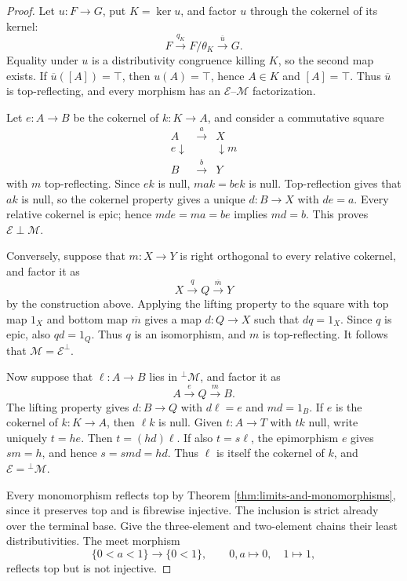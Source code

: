 \documentclass[12pt,oneside,reqno]{amsart}
\theoremstyle{definition}
\theoremstyle{remark}
\begin{document}
\begin{proof}
Let \(u:F\to G\), put \(K=\ker u\), and factor \(u\) through the
cokernel of its kernel:
\[
 F\xrightarrow{q_K}F/\theta_K
       \xrightarrow{\overline u}G.
\]
Equality under \(u\) is a distributivity congruence killing \(K\), so
the second map exists.  If
\(\overline u([A])=\top\), then \(u(A)=\top\), hence \(A\in K\) and
\([A]=\top\).  Thus \(\overline u\) is top-reflecting, and every
morphism has an \(\mathcal E\)--\(\mathcal M\) factorization.

Let \(e:A\to B\) be the cokernel of \(k:K\to A\), and consider a
commutative square
\[
\begin{array}{ccc}
A&\xrightarrow{a}&X\\
{\scriptstyle e}\downarrow&&\downarrow{\scriptstyle m}\\
B&\xrightarrow{b}&Y
\end{array}
\]
with \(m\) top-reflecting.  Since \(ek\) is null,
\(mak=bek\) is null.  Top-reflection gives that \(ak\) is null, so the
cokernel property gives a unique \(d:B\to X\) with \(de=a\).  Every
relative cokernel is epic; hence \(mde=ma=be\) implies \(md=b\).
This proves \(\mathcal E\perp\mathcal M\).

Conversely, suppose that \(m:X\to Y\) is right orthogonal to every
relative cokernel, and factor it as
\[
             X\xrightarrow{q}Q\xrightarrow{\overline m}Y
\]
by the construction above.  Applying the lifting property to the square
with top map \(1_X\) and bottom map \(\overline m\) gives a map
\(d:Q\to X\) such that \(dq=1_X\).  Since \(q\) is epic, also
\(qd=1_Q\).  Thus \(q\) is an isomorphism, and \(m\) is
top-reflecting.  It follows that \(\mathcal M=\mathcal E^\perp\).

Now suppose that \(\ell:A\to B\) lies in
\({}^\perp\mathcal M\), and factor it as
\[
                    A\xrightarrow{e}Q\xrightarrow{m}B.
\]
The lifting property gives \(d:B\to Q\) with \(d\ell=e\) and
\(md=1_B\).  If \(e\) is the cokernel of \(k:K\to A\), then
\(\ell k\) is null.  Given \(t:A\to T\) with \(tk\) null, write
uniquely \(t=he\).  Then \(t=(hd)\ell\).  If also \(t=s\ell\), the
epimorphism \(e\) gives \(sm=h\), and hence \(s=smd=hd\).  Thus
\(\ell\) is itself the cokernel of \(k\), and
\(\mathcal E={}^\perp\mathcal M\).

Every monomorphism reflects top by Theorem
\ref{thm:limits-and-monomorphisms}, since it preserves top and is
fibrewise injective.  The inclusion is strict already over the terminal
base.  Give the three-element and two-element chains their least
distributivities.  The meet morphism
\[
 \{0<a<1\}\longrightarrow\{0<1\},\qquad
 0,a\longmapsto0,\quad 1\longmapsto1,
\]
reflects top but is not injective.
\end{proof}
\end{document}
